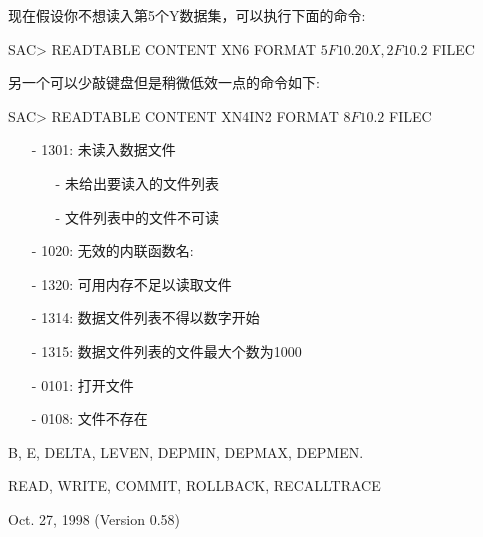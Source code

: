 现在假设你不想读入第5个Y数据集，可以执行下面的命令:
\begin{SACCode}
SAC> READTABLE CONTENT XN6 FORMAT \(5F10.20X,2F10.2\) FILEC
\end{SACCode}
另一个可以少敲键盘但是稍微低效一点的命令如下:
\begin{SACCode}
SAC> READTABLE CONTENT XN4IN2 FORMAT \(8F10.2\) FILEC
\end{SACCode}

\begin{itemize}
\item[-]1301: 未读入数据文件
	\begin{itemize}
  	\item[-]未给出要读入的文件列表
	\item[-] 文件列表中的文件不可读
	\end{itemize}
\item[-]1020: 无效的内联函数名:
\item[-]1320: 可用内存不足以读取文件
\item[-]1314: 数据文件列表不得以数字开始
\item[-]1315: 数据文件列表的文件最大个数为1000
\end{itemize}

\begin{itemize}
\item[-]0101: 打开文件
\item[-]0108: 文件不存在
\end{itemize}

B, E, DELTA, LEVEN, DEPMIN, DEPMAX, DEPMEN.

READ, WRITE, COMMIT, ROLLBACK, RECALLTRACE

Oct. 27, 1998 (Version 0.58)
